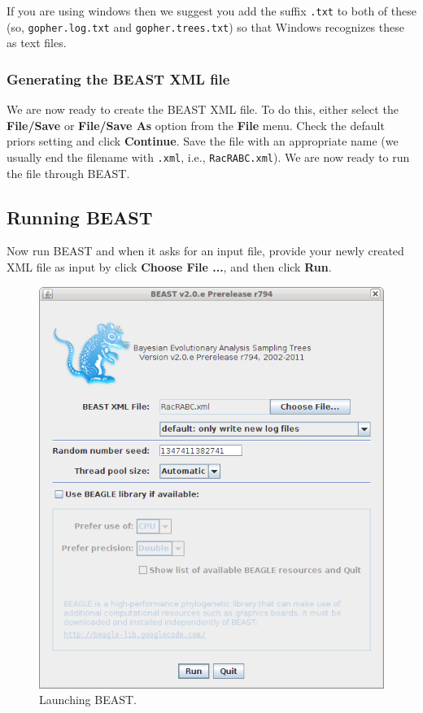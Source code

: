 \documentclass{article}
\begin{document}
If you are using windows then we suggest you add the suffix \texttt{.txt} to both of these (so,
\texttt{gopher.log.txt} and \texttt{gopher.trees.txt}) so that Windows recognizes
these as text files. 











\subsubsection*{Generating the BEAST XML file }

We are now ready to create the BEAST XML file. To do this, either select the {\bf File/Save} or {\bf File/Save As} option from the \textbf{File} menu. Check the default priors setting and click \textbf{Continue}. Save the file with an appropriate name (we usually end the filename with \texttt{.xml}, i.e., \texttt{RacRABC.xml}). We are now ready to run the file through BEAST. 

\subsection*{Running BEAST }

Now run BEAST and when it asks for an input file, provide your newly
created XML file as input by click \textbf{Choose File ...}, and then click \textbf{Run}. 

\begin{figure}
\begin{center}

\includegraphics[scale=0.5]{figures/BEAST}

\end{center}
\caption{\label{fig.BEAST} Launching BEAST.}
\end{figure}
\end{document}
